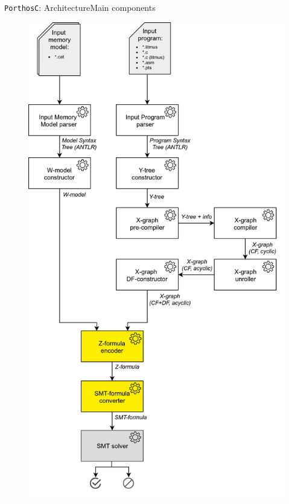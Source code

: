 \documentclass[aspectratio=149]{beamer}
\newcommand{\tool}[1]{\texttt{#1}}
\begin{document}
\begin{frame}{\tool{PorthosC}: Architecture}{Main components}
\begin{minipage}{.5\textwidth}
{\begin{figure}
  \includegraphics[height=.98\textheight,keepaspectratio]{img/arch/general_arch-no_numbering-smt.png}
\end{figure}}
\end{minipage}
\end{frame}
\end{document}
